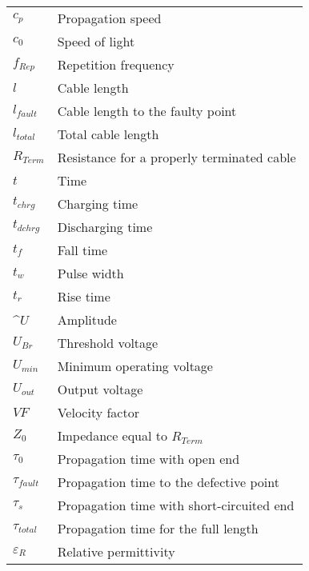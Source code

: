 \begin{table}[h]
    \begin{tabular}{@{}ll@{}}%
        \( c_p \) & Propagation speed\\
		\( c_0 \) & Speed of light\\
		\( f_{Rep} \) & Repetition frequency\\
		\( l \) & Cable length\\
		\( l_{fault} \) & Cable length to the faulty point\\
		\( l_{total} \) & Total cable length\\
		\( R_{Term} \) & Resistance for a properly terminated cable\\
		\( t \) & Time\\
		\( t_{chrg} \) & Charging time\\
		\( t_{dchrg} \) & Discharging time\\
		\( t_f \) & Fall time\\
		\( t_w \) & Pulse width\\
		\( t_{r} \) & Rise time\\
		\( \^U \) & Amplitude\\
		\( U_{Br} \) & Threshold voltage\\
		\( U_{min} \) & Minimum operating voltage\\
		\( U_{out} \) & Output voltage\\
		\( VF \) & Velocity factor\\
		\( Z_0 \) & Impedance equal to \( R_{Term} \)\\
		\( \tau_0 \) & Propagation time with open end\\
		\( \tau_{fault} \) & Propagation time to the defective point\\
		\( \tau_s \) & Propagation time with short-circuited end\\
		\( \tau_{total} \) & Propagation time for the full length\\
		\( \varepsilon_R \) & Relative permittivity\\
    \end{tabular}
    \label{tab:glossar}
\end{table}

